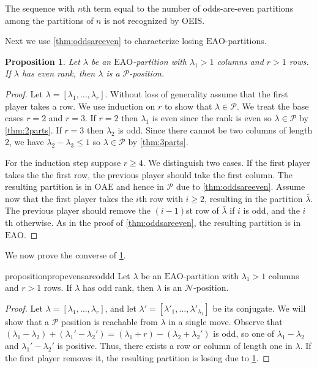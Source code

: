 \documentclass[pdflatex,sn-mathphys-num]{sn-jnl}%
\theoremstyle{thmstyleone}%
\newtheorem{proposition}[theorem]{Proposition}%
\theoremstyle{thmstyletwo}%
\theoremstyle{thmstylethree}%
\newcommand{\p}{\mathcal P}
\newcommand{\n}{\mathcal N}
\newcommand{\OAE}{\mathrm{OAE}}
\newcommand{\EAO}{\mathrm{EAO}}
\begin{document}
The sequence with $n$th term equal to the number of odds-are-even partitions among the partitions of $n$ is not recognized by OEIS. %


Next we use \cref{thm:oddsareeven} to characterize losing $\EAO$-partitions. 

\begin{proposition} \label{prop:evensareodd1}
Let $\lambda$ be an $\EAO$-partition with $\lambda_1 > 1$ columns and $r > 1$ rows. If $\lambda$ has even rank, then $\lambda$ is a $\p$-position. 
\end{proposition}

\begin{proof}
Let $\lambda = [\lambda_1, \ldots, \lambda_r]$. Without loss of generality assume that the first player takes a row. We use induction on $r$ to show that $\lambda \in \p$. 
We treat the base cases $r = 2$ and $r = 3$. 
If $r = 2$ then $\lambda_1$ is even since the rank is even so $\lambda \in \p$ by \cref{thm:2parts}. 
If $r = 3$ then $\lambda_2$ is odd. Since there cannot be two columns of length $2$, we have $\lambda_2-\lambda_3\le1$ so $\lambda \in \p$ by \cref{thm:3parts}.


For the induction step suppose $r\ge 4$. We distinguish two cases. If the first player takes the the first row, the previous player should take the first column. The resulting partition is in $\OAE$ and hence in $\p$ due to \cref{thm:oddsareeven}.
Assume now that the first player takes the $i$th row with $i\ge 2$, resulting in the partition $\bar \lambda$. The previous player should remove the $(i-1)$st row of $\bar\lambda$ if $i$ is odd, and the $i$th otherwise. As in the proof of \cref{thm:oddsareeven}, the resulting partition is in $\EAO$. 
\end{proof}

We now prove the converse of \cref{prop:evensareodd1}. 


\begin{restatable}{proposition}{propevensareoddd} \label{prop:evensareodd2}
Let $\lambda$ be an $\EAO$-partition with $\lambda_1 > 1$ columns and $r > 1$ rows. If $\lambda$ has odd rank, then $\lambda$ is an $\n$-position. 
\end{restatable}
\begin{proof}
Let $\lambda = [\lambda_1, \ldots, \lambda_r]$, and let  $\lambda' = [\lambda'_1, \ldots, \lambda'_{\lambda_1}]$ be its conjugate.
We will show that a $\p$ position is reachable from $\lambda$ in a single move.
Observe that
$(\lambda_1 - \lambda_2) + (\lambda_1' - \lambda_2') = (\lambda_1 + r) - (\lambda_2 + \lambda_2')$ is odd, so one of $\lambda_1 - \lambda_2$ and $\lambda_1' - \lambda_2'$ is positive. Thus, there exists a row or column of length one in $\lambda$. If the first player removes it, the resulting partition is losing due to \cref{prop:evensareodd1}. 
\end{proof}
\end{document}

